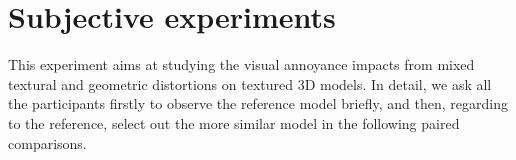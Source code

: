 \section{Subjective experiments}
This experiment aims at studying the visual annoyance impacts from mixed textural and geometric distortions on textured 3D models. In detail, we ask all the participants firstly to observe the reference model briefly, and then, regarding to the reference, select out the more similar model in the following paired comparisons. 